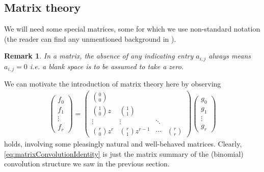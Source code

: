 \documentclass[11pt]{article}
\newtheorem{rmk}{Remark}
\begin{document}
\subsection{Matrix theory}
We will need some special matrices, some for which we use non-standard notation (the reader can find any unmentioned background in \cite{hornJohnson1985}). 
    \begin{rmk}
        In a matrix, the absence of any indicating entry $ a_{i,j} $ always means $ a_{i,j} = 0 $ i.e. a blank space is to be assumed to take a zero.
    \end{rmk}
    
We can motivate the introduction of matrix theory here by observing
    \begin{eqnarray}\label{eq:matrixConvolutionIdentity}
        \begin{pmatrix}
            f_0 \\ f_1 \\ \vdots \\ f_r
        \end{pmatrix}
            =
        \begin{pmatrix}
            \binom{0}{0} \\
            \binom{1}{0}z & \binom{1}{1} \\
            \vdots &\vdots & \ddots \\
            \binom{r}{0}z^r & \binom{r}{1}z^{r-1} & \cdots & \binom{r}{r} 
        \end{pmatrix}
        \begin{pmatrix}
            g_0 \\
            g_1 \\
            \vdots \\
            g_r
        \end{pmatrix}
    \end{eqnarray}
holds, involving some pleasingly natural and well-behaved matrices. Clearly, \eqref{eq:matrixConvolutionIdentity} is just the matrix summary of the (binomial) convolution structure we saw in the previous section.
\end{document}
